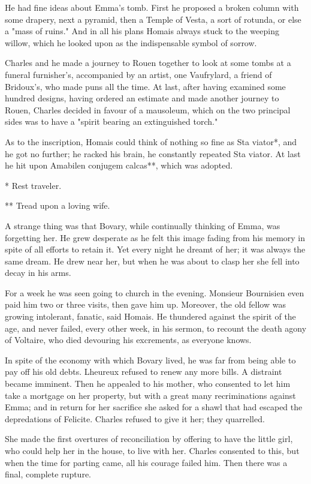 \documentclass{tufte-book}
\begin{document}
He had fine ideas about Emma's tomb. First he proposed a broken column
with some drapery, next a pyramid, then a Temple of Vesta, a sort of
rotunda, or else a "mass of ruins." And in all his plans Homais always
stuck to the weeping willow, which he looked upon as the indispensable
symbol of sorrow.

Charles and he made a journey to Rouen together to look at some tombs
at a funeral furnisher's, accompanied by an artist, one Vaufrylard, a
friend of Bridoux's, who made puns all the time. At last, after having
examined some hundred designs, having ordered an estimate and made
another journey to Rouen, Charles decided in favour of a mausoleum,
which on the two principal sides was to have a "spirit bearing an
extinguished torch."

As to the inscription, Homais could think of nothing so fine as Sta
viator*, and he got no further; he racked his brain, he constantly
repeated Sta viator. At last he hit upon Amabilen conjugem calcas**,
which was adopted.

     * Rest traveler.

     ** Tread upon a loving wife.

A strange thing was that Bovary, while continually thinking of Emma, was
forgetting her. He grew desperate as he felt this image fading from his
memory in spite of all efforts to retain it. Yet every night he dreamt
of her; it was always the same dream. He drew near her, but when he was
about to clasp her she fell into decay in his arms.

For a week he was seen going to church in the evening. Monsieur
Bournisien even paid him two or three visits, then gave him up.
Moreover, the old fellow was growing intolerant, fanatic, said Homais.
He thundered against the spirit of the age, and never failed, every
other week, in his sermon, to recount the death agony of Voltaire, who
died devouring his excrements, as everyone knows.

In spite of the economy with which Bovary lived, he was far from being
able to pay off his old debts. Lheureux refused to renew any more
bills. A distraint became imminent. Then he appealed to his mother, who
consented to let him take a mortgage on her property, but with a great
many recriminations against Emma; and in return for her sacrifice she
asked for a shawl that had escaped the depredations of Felicite. Charles
refused to give it her; they quarrelled.

She made the first overtures of reconciliation by offering to have the
little girl, who could help her in the house, to live with her. Charles
consented to this, but when the time for parting came, all his courage
failed him. Then there was a final, complete rupture.
\end{document}
